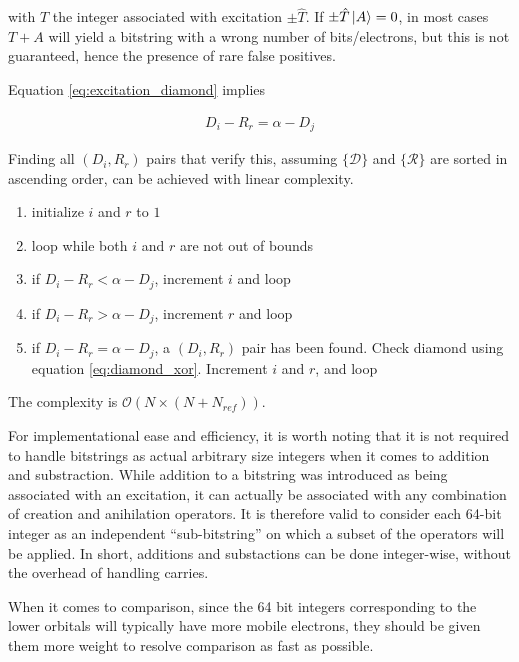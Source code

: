\documentclass[./thesis.tex]{subfiles}
\begin{document}
with $T$ the integer associated with excitation $\pm \hat T$. If $\pm \hat T \ket A = 0$, in most cases $T + A$ will yield a bitstring with a wrong number of bits/electrons, but this is not guaranteed, hence the presence of rare false positives.

Equation \ref{eq:excitation_diamond} implies

\begin{align}
D_i - R_r = \alpha - D_j 
\end{align}

Finding all $(D_i, R_r)$ pairs that verify this, assuming $\{\mathcal{D}\}$ and $\{\mathcal{R}\}$ are sorted in ascending order, can be achieved with linear complexity.


\begin{enumerate}
\item
initialize $i$ and $r$ to $1$
\item
loop while both $i$ and $r$ are not out of bounds
\item
if $D_i - R_r < \alpha - D_j$, increment $i$ and loop
\item
if $D_i - R_r > \alpha - D_j$, increment $r$ and loop
\item
if $D_i - R_r = \alpha - D_j$, a $(D_i, R_r)$ pair has been found. Check diamond using equation \ref{eq:diamond_xor}. Increment $i$ and $r$, and loop
\end{enumerate}

The complexity is $\mathcal{O}(N \times (N+N_{ref}))$.


For implementational ease and efficiency, it is worth noting that it is not required to handle bitstrings as actual arbitrary size integers when it comes to addition and substraction. While addition to a bitstring was introduced as being associated with an excitation, it can actually be associated with any combination of creation and anihilation operators. It is therefore valid to consider each 64-bit integer as an independent ``sub-bitstring'' on which a subset of the operators will be applied. In short, additions and substactions can be done integer-wise, without the overhead of handling carries.

When it comes to comparison, since the 64 bit integers corresponding to the lower orbitals will typically have more mobile electrons, they should be given them more weight to resolve comparison as fast as possible.
\end{document}
